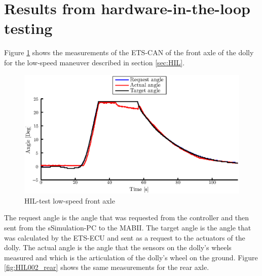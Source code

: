 \documentclass[ExampleMasters.tex]{subfiles}
\begin{document}






\section{Results from hardware-in-the-loop testing}

Figure \ref{fig:HIL002_front} shows the measurements of the ETS-CAN of the front axle of the dolly for the low-speed maneuver described in section \ref{sec:HIL}.\\

\begin{figure}[!htb]
	\centering
	\includegraphics[width=1\linewidth]{figures/HIL002_front}
	\caption{HIL-test low-speed front axle}
	
	\label{fig:HIL002_front}
\end{figure}

The request angle is the angle that was requested from the controller and then sent from the sSimulation-PC to the \gls{MABII}. The target angle is the angle that was calculated by the \gls{ETS}-\gls{ECU} and sent as a request to the actuators of the dolly. The actual angle is the angle that the sensors on the dolly's wheels measured and which is the articulation of the dolly's wheel on the ground.
Figure \ref{fig:HIL002_rear} shows the same measurements for the rear axle.
\end{document}
